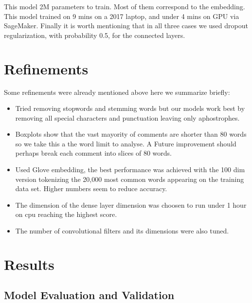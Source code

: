 \documentclass{report}
\begin{document}
This model 2M parameters to train. Most of them correspond to the embedding. This model trained on 9 mins
on a 2017 laptop, and under 4 mins on GPU via SageMaker. Finally it is worth mentioning that in all three cases 
we used dropout regularization, with probability 0.5, for the connected layers.

\section{Refinements}

Some refinements were already mentioned above here we summarize briefly:
\begin{itemize}
\item Tried removing stopwords and stemming words but our models work best by removing all special 
characters and punctuation leaving only aphostrophes. 
\item Boxplots show that the vast mayority of comments are shorter than 80 words so we take this a the word 
limit to analyse. A Future improvement should perhaps break each comment into slices of 80 words. 
\item Used Glove embedding, the best performance was achieved with the 100 dim version tokenizing the 
20,000 most common words appearing on the training data set. Higher numbers seem to reduce accuracy. 
\item The dimension of the dense layer dimension was choosen to run under 1 hour on cpu reaching the highest score. 
\item The number of convolutional filters and its dimensions were also tuned. 
\end{itemize}

\section{Results} 


\subsection{Model Evaluation and Validation}
\end{document}

